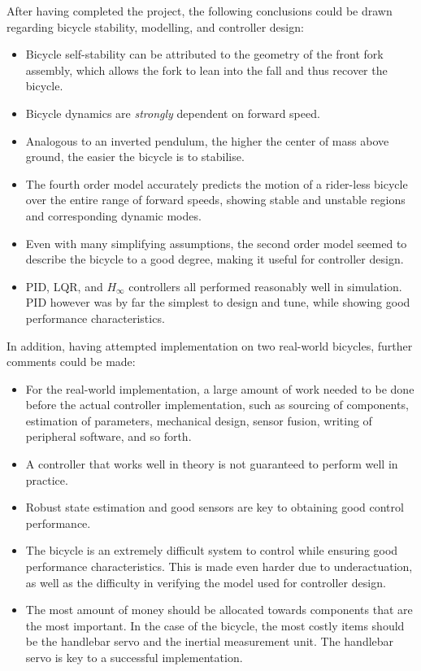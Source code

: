 After having completed the project, the following conclusions could be drawn regarding bicycle stability, modelling, and controller design:

\begin{itemize}
\item{Bicycle self-stability can be attributed to the geometry of the front fork assembly, which allows the fork to lean into the fall and thus recover the bicycle.}
\item{Bicycle dynamics are \textit{strongly} dependent on forward speed.}
\item{Analogous to an inverted pendulum, the higher the center of mass above ground, the easier the bicycle is to stabilise.}
\item{The fourth order model accurately predicts the motion of a rider-less bicycle over the entire range of forward speeds, showing stable and unstable regions and corresponding dynamic modes.}
\item{Even with many simplifying assumptions, the second order model seemed to describe the bicycle to a good degree, making it useful for controller design.}
\item{PID, LQR, and $H_{\infty}$ controllers all performed reasonably well in simulation. PID however was by far the simplest to design and tune, while showing good performance characteristics.}
\end{itemize}

In addition, having attempted implementation on two real-world bicycles, further comments could be made:

\begin{itemize}
\item{For the real-world implementation, a large amount of work needed to be done before the actual controller implementation, such as sourcing of components, estimation of parameters, mechanical design, sensor fusion, writing of peripheral software, and so forth.}
\item{A controller that works well in theory is not guaranteed to perform well in practice.}
\item{Robust state estimation and good sensors are key to obtaining good control performance.}
\item{The bicycle is an extremely difficult system to control while ensuring good performance characteristics. This is made even harder due to underactuation, as well as the difficulty in verifying the model used for controller design.}
\item{The most amount of money should be allocated towards components that are the most important. In the case of the bicycle, the most costly items should be the handlebar servo and the inertial measurement unit. The handlebar servo is key to a successful implementation.}
\end{itemize}

